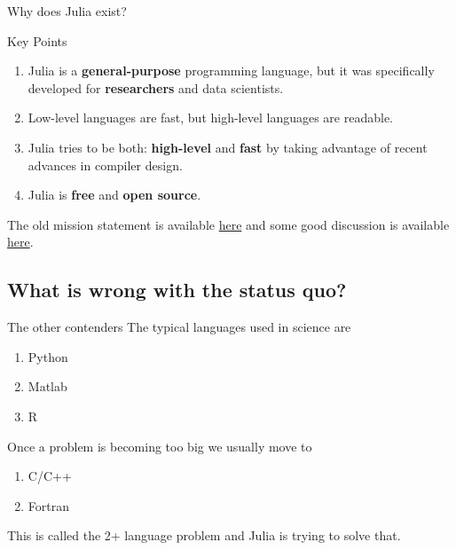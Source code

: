 \documentclass{beamer}
\begin{document}
\begin{frame}{Why does Julia exist?}
	\begin{block}{Key Points}
		\vspace*{2mm}
		\begin{enumerate}
			\item Julia is a \textbf{general-purpose} programming language, but it was specifically developed for \textbf{researchers} and data scientists.\itemsep=3mm
			\item Low-level languages are fast, but high-level languages are readable.
			\item Julia tries to be both: \textbf{high-level} and \textbf{fast} by taking advantage of recent advances in compiler design.%
			\item Julia is \textbf{free} and \textbf{open source}.
		\end{enumerate}
	\vspace*{1mm}
	\end{block}
	\vspace*{3mm}
	The old mission statement is available \href{https://julialang.org/blog/2012/02/why-we-created-julia}{\color{blue} here} and some good discussion is available \href{https://discourse.julialang.org/t/julia-motivation-why-werent-numpy-scipy-numba-good-enough/2236/}{\color{blue} here}. 
	
\end{frame}


\subsection{What is wrong with the status quo?}
\begin{frame}{The other contenders}
  The typical languages used in science are
  \begin{enumerate}
    \item Python
    \item Matlab
    \item R
  \end{enumerate}
\vspace*{3mm}
  Once a problem is becoming too big we usually move to
  \begin{enumerate}
    \item C/C++
    \item Fortran
  \end{enumerate}
\vspace*{3mm}
  This is called the 2+ language problem and Julia is trying to solve that.
\end{frame}
\end{document}
